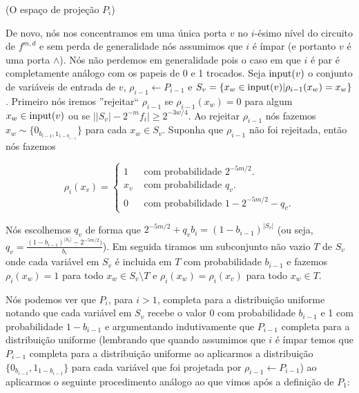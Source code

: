 \begin{defi} (O espaço de projeção $P_{i}$) \label{defi_Pi}

De novo, nós nos concentramos em uma única porta $v$ no $i$-ésimo nível do circuito de $f^{m, d}$ e sem perda de generalidade nós assumimos que $i$ é ímpar (e portanto $v$ é uma porta $\land$). Nós não perdemos em generalidade pois o caso em que $i$ é par é completamente análogo com os papeis de 0 e 1 trocados. Seja $\text{input}(v)$ o conjunto de variáveis de entrada de $v$, $\rho_{i - 1} \leftarrow P_{i - 1}$ e $S_{v} = \{x_{w} \in \text{input}(v) \lvert \rho_{i - 1}(x_{w}) = x_{w}\}$. Primeiro nós iremos ''rejeitar`` $\rho_{i - 1}$ se $\rho_{i - 1}(x_{w}) = 0$ para algum $x_{w} \in \text{input}(v)$ ou se $\big\lvert \lvert S_{v} \rvert - 2^{-m}f_{i} \big\rvert \geq 2^{-3w/4}$. Ao rejeitar $\rho_{i - 1}$ nós fazemos $x_{w} \sim \{0_{b_{i - 1}, 1_{1 - b_{i - 1}}}\}$ para cada $x_{w} \in S_{v}$. Suponha que $\rho_{i - 1}$ não foi rejeitada, então nós fazemos

\begin{equation*}
	\rho_{i}(x_{v}) = \begin{cases}
			        	  1 & \text{ com probabilidade } 2^{-5m/2}. \\
			        	  x_{v} & \text{ com probabilidade } q_{v}. \\
			        	  0 & \text{ com probabilidade } 1 - 2^{-5m/2} - q_{v}.
			        \end{cases}
\end{equation*}

Nós escolhemos $q_{v}$ de forma que $2^{-5m/2} + q_{v}b_{i} = (1 - b_{i - 1})^{\lvert S_{v} \rvert}$ (ou seja, $q_{v} = \frac{(1 - b_{i - 1})^{\lvert S_{v} \rvert} - 2^{-5m/2})}{b_{i}}$). Em seguida tiramos um subconjunto não vazio $T$ de $S_{v}$ onde cada variável em $S_{v}$ é incluida em $T$ com probabilidade $b_{i - 1}$ e fazemos $\rho_{i}(x_{w}) = 1$ para todo $x_{w} \in S_{v} \setminus T$ e $\rho_{i}(x_{w}) = \rho_{i}(x_{v})$ para todo $x_{w} \in T$.

\end{defi}

Nós podemos ver que $P_{i}$, para $i > 1$, completa para a distribuição uniforme notando que cada variável em $S_{v}$ recebe o valor 0 com probabilidade $b_{i - 1}$ e 1 com probabilidade $1 - b_{i - 1}$ e argumentando indutivamente que $P_{i - 1}$ completa para a distribuição uniforme (lembrando que quando assumimos que $i$ é ímpar temos que $P_{i - 1}$ completa para a distribuição uniforme ao aplicarmos a distribuição $\{0_{b_{i - 1}}, 1_{1 - b_{i - 1}}\}$ para cada variável que foi projetada por $\rho_{i - 1} \leftarrow P_{i - 1}$) ao aplicarmos o seguinte procedimento análogo ao que vimos após a definição de $P_{1}$:

